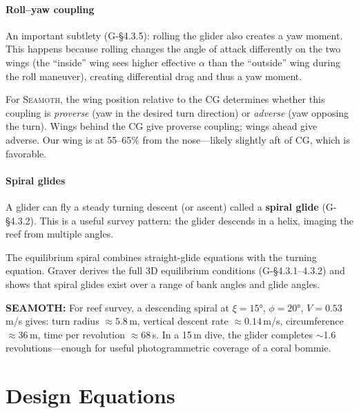 \documentclass[11pt,a4paper]{article}
\newcommand{\seamoth}{\textsc{Seamoth}}
\newcommand{\note}[1]{\par\smallskip\noindent\colorbox{blue!8}{\parbox{\dimexpr\linewidth-2\fboxsep}{%
  \small\textbf{SEAMOTH:} #1}}\smallskip}
\begin{document}
\subsection{Roll--yaw coupling}
\label{sec:rollyaw}

An important subtlety (G-\S4.3.5): rolling the glider also creates a yaw moment.
This happens because rolling changes the angle of attack differently on the two wings
(the ``inside'' wing sees higher effective $\alpha$ than the ``outside'' wing during
the roll maneuver), creating differential drag and thus a yaw moment.

For \seamoth{}, the wing position relative to the CG determines whether this coupling
is \emph{proverse} (yaw in the desired turn direction) or \emph{adverse} (yaw opposing
the turn).  Wings behind the CG give proverse coupling; wings ahead give adverse.
Our wing is at 55--65\% from the nose---likely slightly aft of CG, which is favorable.

\subsection{Spiral glides}

A glider can fly a steady turning descent (or ascent) called a \textbf{spiral glide}
(G-\S4.3.2).  This is a useful survey pattern: the glider descends in a helix,
imaging the reef from multiple angles.

The equilibrium spiral combines straight-glide equations with the turning
equation.  Graver derives the full 3D equilibrium conditions (G-\S4.3.1--4.3.2)
and shows that spiral glides exist over a range of bank angles and glide angles.

\note{For reef survey, a descending spiral at $\xi=15°$, $\phi=20°$, $V=0.53$\,m/s
gives: turn radius $\approx5.8$\,m, vertical descent rate $\approx0.14$\,m/s,
circumference $\approx36$\,m, time per revolution $\approx68$\,s.  In a 15\,m dive,
the glider completes $\sim$1.6 revolutions---enough for useful photogrammetric coverage
of a coral bommie.}


\part{Design Equations}

\end{document}
